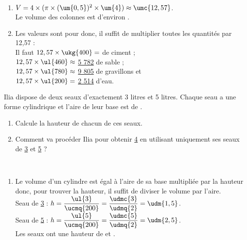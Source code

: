 \begin{colonne*exercice}
\begin{corrige}
   \ \\ [-5mm]
   \begin{enumerate}
      \item $V =4\times(\pi\times(\um{0,5})^2\times\um{4}) \approx \umc{12,57}$. \\
         {\blue Le volume des colonnes est d'environ }.
      \item Les valeurs sont pour  donc, il suffit de multiplier toutes les quantités par 12,57 : \\
         Il faut $12,57\times\ukg{400} =$ {\blue {} de ciment} ; \\
         $12,57\times\ul{460} \approx$ {\blue \ul{5 782} de sable} ; \\
         $12,57\times\ul{780} \approx$ {\blue \ul{9 805} de gravillons} et \\
         $12,57\times\ul{200} =$ {\blue \ul{2 514} d'eau}.
   \end{enumerate}
\end{corrige}

\bigskip


\begin{exercice} %
   Ilia dispose de deux seaux d'exactement 3 litres et 5 litres. Chaque seau a une forme cylindrique et l'aire de leur base est de .
   \begin{enumerate}
      \item Calcule la hauteur de chacun de ces seaux.
      \item Comment va procéder Ilia pour obtenir \ul{4} en utilisant uniquement ses seaux de \ul{3} et \ul{5} ?
   \end{enumerate}
\end{exercice}

\begin{corrige}
  \ \\ [-5mm]
  \begin{enumerate}
      \item Le volume d'un cylindre est égal à l'aire de sa base multipliée par la hauteur donc, pour trouver la hauteur, il suffit de diviser le volume par l'aire. \\
         Seau de \ul{3} : $h =\dfrac{\ul{3}}{\ucmq{200}} =\dfrac{\udmc{3}}{\udmq{2}} =\udm{1,5}$. \\ [1mm]
         Seau de \ul{5} : $h =\dfrac{\ul{5}}{\ucmq{200}} =\dfrac{\udmc{5}}{\udmq{2}} =\udm{2,5}$. \\ [1mm] 
      Les seaux ont une hauteur de {\blue {} et }.
   \end{enumerate}


\end{corrige}
\end{colonne*exercice}
